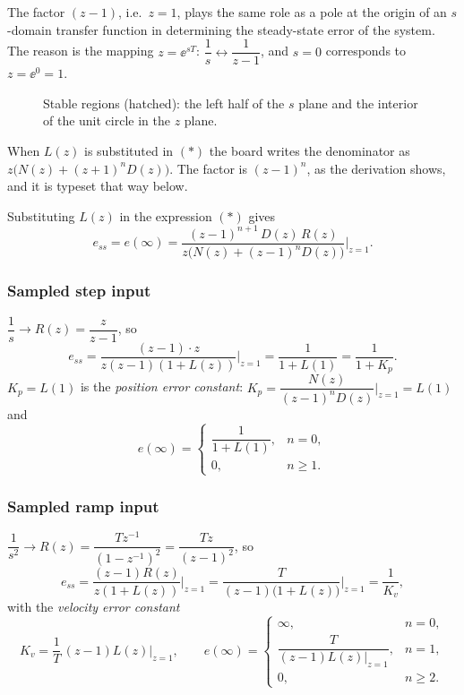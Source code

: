 The factor $(z-1)$, i.e.\ $z=1$, plays the same role as a pole at the origin of an $s$-domain transfer
function in determining the steady-state error of the system. The reason is the mapping $z=\ee^{sT}$:
$\dfrac1s\leftrightarrow\dfrac{1}{z-1}$, and $s=0$ corresponds to $z=\ee^{0}=1$.

\begin{figure}[ht]
\centering
\resizebox{0.78\linewidth}{!}{\figSZplanes}
\caption{Stable regions (hatched): the left half of the $s$ plane and the interior of the unit circle in the
$z$ plane.}
\end{figure}

\begin{boardnote}
When $L(z)$ is substituted in $(*)$ the board writes the denominator as $z\bigl(N(z)+(z+1)^{n}D(z)\bigr)$.
The factor is $(z-1)^{n}$, as the derivation shows, and it is typeset that way below.
\end{boardnote}
Substituting $L(z)$ in the expression $(*)$ gives
\begin{equation}
  e_{ss}=e(\infty)=\frac{(z-1)^{n+1}\,D(z)\,R(z)}{z\bigl(N(z)+(z-1)^{n}D(z)\bigr)}\Big|_{z=1}.
\end{equation}

\subsubsection*{Sampled step input}
$\dfrac1s\to R(z)=\dfrac{z}{z-1}$, so
\[
  e_{ss}=\frac{(z-1)\cdot z}{z(z-1)(1+L(z))}\Big|_{z=1}=\frac{1}{1+L(1)}=\frac{1}{1+K_p}.
\]
$K_p=L(1)$ is the \emph{position error constant}: $K_p=\dfrac{N(z)}{(z-1)^{n}D(z)}\Big|_{z=1}=L(1)$ and
\[
  e(\infty)=\begin{cases}\dfrac{1}{1+L(1)},&n=0,\\[2mm] 0,&n\ge1.\end{cases}
\]

\subsubsection*{Sampled ramp input}
$\dfrac{1}{s^{2}}\to R(z)=\dfrac{Tz^{-1}}{(1-z^{-1})^{2}}=\dfrac{Tz}{(z-1)^{2}}$, so
\[
  e_{ss}=\frac{(z-1)R(z)}{z(1+L(z))}\Big|_{z=1}=\frac{T}{(z-1)\bigl(1+L(z)\bigr)}\Big|_{z=1}=\frac{1}{K_v},
\]
with the \emph{velocity error constant}
\[
  K_v=\frac1T\,(z-1)L(z)\Big|_{z=1},\qquad
  e(\infty)=\begin{cases}\infty,&n=0,\\[1mm]\dfrac{T}{(z-1)L(z)\big|_{z=1}},&n=1,\\[3mm]0,&n\ge2.\end{cases}
\]


